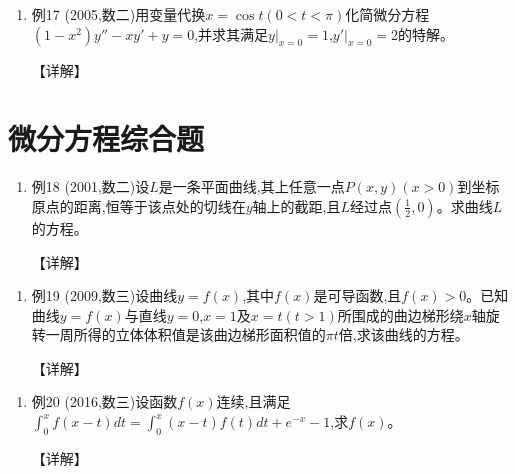 \documentclass[12pt, a4paper, oneside, UTF8]{ctexbook}
\begin{document}
\begin{enumerate}[label=\arabic*.,start=17]
    \item 例17 (2005,数二)用变量代换$x=\cos t(0<t<\pi)$化简微分方程$(1-x^2)y''-xy'+y=0$,并求其满足$y|_{x=0}=1$,$y'|_{x=0}=2$的特解。
    
    \begin{solution}
    【详解】
    \end{solution}
\end{enumerate}

\section{ 微分方程综合题}

\begin{remark}
\end{remark}

\begin{enumerate}[label=\arabic*.,start=18]
    \item 例18 (2001,数二)设$L$是一条平面曲线,其上任意一点$P(x,y)(x>0)$到坐标原点的距离,恒等于该点处的切线在$y$轴上的截距,且$L$经过点$(\frac{1}{2},0)$。求曲线$L$的方程。
    
    \begin{solution}
    【详解】
    \end{solution}
\end{enumerate}

\begin{remark}
\end{remark}

\begin{enumerate}[label=\arabic*.,start=19]
    \item 例19 (2009,数三)设曲线$y=f(x)$,其中$f(x)$是可导函数,且$f(x)>0$。已知曲线$y=f(x)$与直线$y=0$,$x=1$及$x=t(t>1)$所围成的曲边梯形绕$x$轴旋转一周所得的立体体积值是该曲边梯形面积值的$\pi t$倍,求该曲线的方程。
    
    \begin{solution}
    【详解】
    \end{solution}
\end{enumerate}

\begin{remark}
\end{remark}

\begin{enumerate}[label=\arabic*.,start=20]
    \item 例20 (2016,数三)设函数$f(x)$连续,且满足$\int_0^x f(x-t)dt=\int_0^x(x-t)f(t)dt+e^{-x}-1$,求$f(x)$。
    
    \begin{solution}
    【详解】
    \end{solution}
\end{enumerate}
\end{document}

